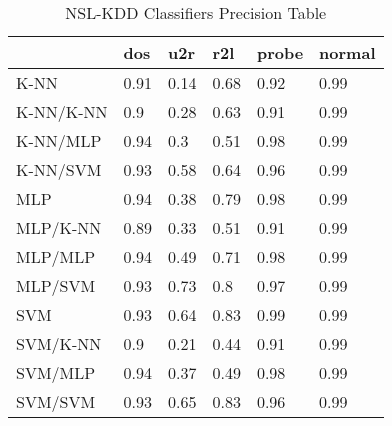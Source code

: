\begin{table}[H]
\centering
\caption{NSL-KDD Classifiers Precision Table}
\label{nslprecisiontable}
\begin{tabular}{@{}llllll@{}}
\toprule
          & dos  & u2r  & r2l  & probe & normal \\ \midrule
K-NN      & 0.91 & 0.14 & 0.68 & 0.92  & 0.99   \\
K-NN/K-NN & 0.9  & 0.28 & 0.63 & 0.91  & 0.99   \\
K-NN/MLP  & 0.94 & 0.3  & 0.51 & 0.98  & 0.99   \\
K-NN/SVM  & 0.93 & 0.58 & 0.64 & 0.96  & 0.99   \\
MLP       & 0.94 & 0.38 & 0.79 & 0.98  & 0.99   \\
MLP/K-NN  & 0.89 & 0.33 & 0.51 & 0.91  & 0.99   \\
MLP/MLP   & 0.94 & 0.49 & 0.71 & 0.98  & 0.99   \\
MLP/SVM   & 0.93 & 0.73 & 0.8  & 0.97  & 0.99   \\
SVM       & 0.93 & 0.64 & 0.83 & 0.99  & 0.99   \\
SVM/K-NN  & 0.9  & 0.21 & 0.44 & 0.91  & 0.99   \\
SVM/MLP   & 0.94 & 0.37 & 0.49 & 0.98  & 0.99   \\
SVM/SVM   & 0.93 & 0.65 & 0.83 & 0.96  & 0.99  \\ \bottomrule
\end{tabular}
\end{table}
